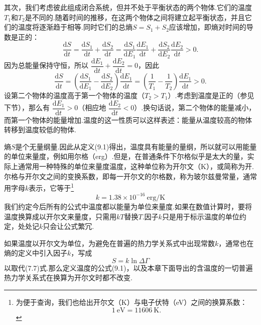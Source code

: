 其次，我们考虑彼此组成闭合系统，但并不处于平衡状态的两个物体.它们的温度$T_1$和$T_2$是不同的.随着时间的推移，在这两个物体之间将建立起平衡状态，并且它们的温度将逐渐趋于相等.同时它们的总熵$S=S_1+S_2$应该增加，即熵对时间的导数是正的：
\begin{equation*}
  \frac{\mathrm{d}S}{\mathrm{d}t}
  =\frac{\mathrm{d}S_1}{\mathrm{d}t}+\frac{\mathrm{d}S_2}{\mathrm{d}t}
  =\frac{\mathrm{d}S_1}{\mathrm{d}E_1}\frac{\mathrm{d}E_1}{\mathrm{d}t}
  +\frac{\mathrm{d}S_2}{\mathrm{d}E_2}\frac{\mathrm{d}E_2}{\mathrm{d}t}>0.
\end{equation*}
因为总能量保持守恒，所以
$\dfrac{\mathrm{d}E_1}{\mathrm{d}t}+\dfrac{\mathrm{d}E_2}{\mathrm{d}t}=0$，因此
\begin{equation*}
  \frac{\mathrm{d}S}{\mathrm{d}t}
  =\left(\frac{\mathrm{d}S_1}{\mathrm{d}E_1}
  -\frac{\mathrm{d}S_2}{\mathrm{d}E_2}\right)\frac{\mathrm{d}E_1}{\mathrm{d}t}
  =\left(\frac{1}{T_1}-\frac{1}{T_2}\right)\frac{\mathrm{d}E_1}{\mathrm{d}t}>0.
\end{equation*}
设第二个物体的温度高于第一个物体的温度（$T_2>T_1$）.考虑到温度是正的（参见下节），那么有
$\dfrac{\mathrm{d}E_1}{\mathrm{d}t}>0$（相应地
$\dfrac{\mathrm{d}E_2}{\mathrm{d}t}<0$）.换句话说，第二个物体的能量减小，而第一个物体的能量增加.温度的这一性质可以这样表述：能量从温度较高的物体转移到温度较低的物体.

熵$S$是个无量纲量.因此从定义(9.1)得出，温度具有能量的量纲，所以就可以用能量的单位来量度，例如用尔格（erg）.但是，在普通条件下尔格似乎是太大的量，实际上通常用一种特殊的单位来量度温度，这种单位称为开尔文（K），或简称为开.尔格与开尔文之间的变换系数，即每一开尔文的尔格数，称为玻尔兹曼常量，通常用字母$k$表示，它等于\footnote{为便于查询，我们也给出开尔文（K）与电子伏特（eV）之间的换算系数：
\begin{equation*}
  1\ \mathrm{eV}=11606\ \mathrm{K}.
\end{equation*}}
\begin{equation*}
  k=1.38\times10^{-16}\ \mathrm{erg/K}
\end{equation*}
我们约定今后所有的公式中温度都以能量为单位来量度.如果在数值计算时，要将温度换算成以开尔文来量度，只需用$kT$替换$T$.因子$k$只是用于标示温度的单位约定，处处记$k$只会让公式繁冗.

如果温度以开尔文为单位，为避免在普遍的热力学关系式中出现常数$k$，通常也在熵的定义中引入因子$k$，写成
\begin{equation}
  S=k\ln\Delta\Gamma
\end{equation}
以取代(7.7)式.那么定义温度的公式(9.1)，以及本章下面导出的含温度的一切普遍热力学关系式在换算为开尔文时都不改变.

